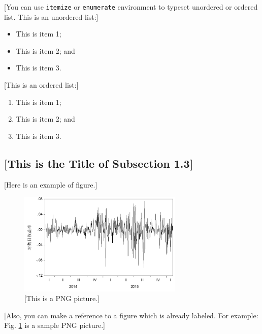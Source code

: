 \documentclass[a4paper,11pt,onecolumn,twoside]{article}
\begin{document}
[You can use \texttt{itemize} or \texttt{enumerate} environment to typeset unordered or ordered list. This is an unordered list:]
\begin{itemize}
    \item This is item 1;
    \item This is item 2; and
    \item This is item 3.
\end{itemize}

[This is an ordered list:]
\begin{enumerate}
    \item This is item 1;
    \item This is item 2; and
    \item This is item 3.
\end{enumerate}

\subsection{[This is the Title of Subsection 1.3]}
 [Here is an example of figure.]
\begin{figure}[H]
  \centering
  \includegraphics[width=0.7\textwidth]{figures/fig1.png}
  \caption{[This is a PNG picture.]} \label{pngsample}
\end{figure}

[Also, you can make a reference to a figure which is already labeled. For example: Fig. \ref{pngsample} is a sample PNG picture.]
\end{document}
